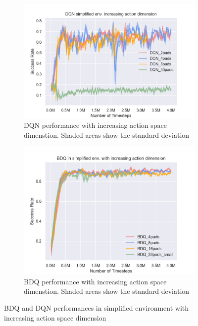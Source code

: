 \begin{figure}[!htbp]
    \begin{subfigure}{0.49\textwidth}
        \includegraphics[width=\linewidth]{figures/DQN_simplified_env_increasing_action_dimension}
        \caption{DQN performance with increasing action space dimenstion. Shaded areas show the standard deviation } \label{fig:dqnincrease}
    \end{subfigure}%
    \hspace*{\fill}   %
    \begin{subfigure}{0.49\textwidth}
        \includegraphics[width=\linewidth]{figures/BDQ_in_simplified_env_with_increasing_action_dimension}
        \caption{BDQ performance with increasing action space dimenstion. Shaded areas show the standard deviation} \label{fig:bdqincrease}
    \end{subfigure}%
    \hspace*{\fill}   %


\caption{BDQ and DQN performances in simplified environment with increasing action space dimension \label{fig:scenes}}
\end{figure}



